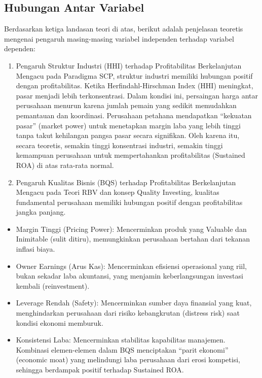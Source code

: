 \documentclass[12pt,a4paper]{report}
\providecommand{\tightlist}{%
  \setlength{\itemsep}{0pt}\setlength{\parskip}{0pt}%
}
\begin{document}
\hypertarget{hubungan-antar-variabel}{%
\subsection{Hubungan Antar Variabel}\label{hubungan-antar-variabel}}

Berdasarkan ketiga landasan teori di atas, berikut adalah penjelasan
teoretis mengenai pengaruh masing-masing variabel independen terhadap
variabel dependen:

\begin{enumerate}
\def\labelenumi{\arabic{enumi}.}
\item
  Pengaruh Struktur Industri (HHI) terhadap Profitabilitas Berkelanjutan
  Mengacu pada Paradigma SCP, struktur industri memiliki hubungan
  positif dengan profitabilitas. Ketika Herfindahl-Hirschman Index (HHI)
  meningkat, pasar menjadi lebih terkonsentrasi. Dalam kondisi ini,
  persaingan harga antar perusahaan menurun karena jumlah pemain yang
  sedikit memudahkan pemantauan dan koordinasi. Perusahaan petahana
  mendapatkan ``kekuatan pasar'' (market power) untuk menetapkan margin
  laba yang lebih tinggi tanpa takut kehilangan pangsa pasar secara
  signifikan. Oleh karena itu, secara teoretis, semakin tinggi
  konsentrasi industri, semakin tinggi kemampuan perusahaan untuk
  mempertahankan profitabilitas (Sustained ROA) di atas rata-rata
  normal.
\item
  Pengaruh Kualitas Bisnis (BQS) terhadap Profitabilitas Berkelanjutan
  Mengacu pada Teori RBV dan konsep Quality Investing, kualitas
  fundamental perusahaan memiliki hubungan positif dengan profitabilitas
  jangka panjang.
\end{enumerate}

\begin{itemize}
\tightlist
\item
  Margin Tinggi (Pricing Power): Mencerminkan produk yang Valuable dan
  Inimitable (sulit ditiru), memungkinkan perusahaan bertahan dari
  tekanan inflasi biaya.
\item
  Owner Earnings (Arus Kas): Mencerminkan efisiensi operasional yang
  riil, bukan sekadar laba akuntansi, yang menjamin keberlangsungan
  investasi kembali (reinvestment).
\item
  Leverage Rendah (Safety): Mencerminkan sumber daya finansial yang
  kuat, menghindarkan perusahaan dari risiko kebangkrutan (distress
  risk) saat kondisi ekonomi memburuk.
\item
  Konsistensi Laba: Mencerminkan stabilitas kapabilitas manajemen.
  Kombinasi elemen-elemen dalam BQS menciptakan ``parit ekonomi''
  (economic moat) yang melindungi laba perusahaan dari erosi kompetisi,
  sehingga berdampak positif terhadap Sustained ROA.
\end{itemize}
\end{document}
